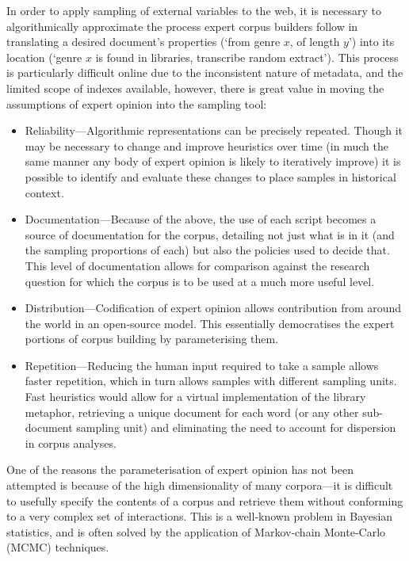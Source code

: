 In order to apply sampling of external variables to the web, it is necessary to algorithmically approximate the process expert corpus builders follow in translating a desired document's properties (`from genre $x$, of length $y$') into its location (`genre $x$ is found in libraries, transcribe random extract').  This process is particularly difficult online due to the inconsistent nature of metadata, and the limited scope of indexes available, however, there is great value in moving the assumptions of expert opinion into the sampling tool:

\begin{itemize}
    \item Reliability---Algorithmic representations can be precisely repeated.  Though it may be necessary to change and improve heuristics over time (in much the same manner any body of expert opinion is likely to iteratively improve) it is possible to identify and evaluate these changes to place samples in historical context.
    \item Documentation---Because of the above, the use of each script becomes a source of documentation for the corpus, detailing not just what is in it (and the sampling proportions of each) but also the policies used to decide that.  This level of documentation allows for comparison against the research question for which the corpus is to be used at a much more useful level.
    \item Distribution---Codification of expert opinion allows contribution from around the world in an open-source model.  This essentially democratises the expert portions of corpus building by parameterising them.
    \item Repetition---Reducing the human input required to take a sample allows faster repetition, which in turn allows samples with different sampling units.  Fast heuristics would allow for a virtual implementation of the library metaphor\cite{evert2006random}, retrieving a unique document for each word (or any other sub-document sampling unit) and eliminating the need to account for dispersion in corpus analyses.
\end{itemize}


One of the reasons the parameterisation of expert opinion has not been attempted is because of the high dimensionality of many corpora---it is difficult to usefully specify the contents of a corpus and retrieve them without conforming to a very complex set of interactions.  This is a well-known problem in Bayesian statistics, and is often solved by the application of Markov-chain Monte-Carlo (MCMC) techniques\cite{gibbs1993}.

